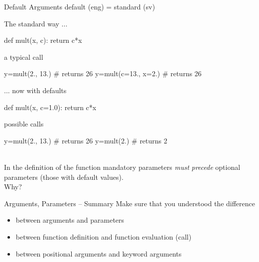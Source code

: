 \documentclass[hyperref={pdfpagelabels=false},table]{beamer}
\begin{document}
\begin{frame}[fragile]{Default Arguments}
{\footnotesize default (eng) = standard (sv)}\ \\
\vfill
\begin{minipage}[top]{0.4\textwidth}
The standard way ...
\begin{python}
def mult(x, c):
    return c*x
\end{python}
a typical call
\begin{python}
y=mult(2., 13.)
# returns 26
y=mult(c=13., x=2.)
# returns 26
\end{python}

\end{minipage}\hfill
\begin{minipage}[top]{0.4\textwidth}
... now with defaults
\begin{python}
def mult(x, c=1.0):
    return c*x
\end{python}
possible calls
\begin{python}
y=mult(2., 13.)
# returns 26
y=mult(2.)
# returns 2
\end{python}
\end{minipage}\\
\vfill
In the definition of the function mandatory parameters \emph{must}
\emph{precede} optional parameters (those with default values).\\
Why?
\end{frame}
\begin{frame}[fragile]{Arguments, Parameters -- Summary}
Make sure that you understood the difference
\begin{itemize}
\item between arguments and parameters
\item between function definition and function evaluation (call)
\item between positional arguments and keyword arguments
\end{itemize}
\end{frame}
\end{document}
